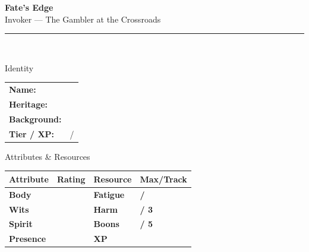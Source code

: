 \documentclass[10pt]{article}
\begin{document}
\begin{center}
    {\Huge\bfseries\sffamily\color{edgered} Fate's Edge}\\[0.2em]
    {\large\sffamily Invoker --- The Gambler at the Crossroads}\\[0.5em]
    \rule{0.5\textwidth}{0.5pt}\\[1em]
\end{center}

\begin{minipage}[t]{0.48\linewidth}
    \begin{charbox}{Identity}
        \begin{tabular}{p{2.5cm} p{5cm}}
            \textbf{Name:} & \underline{\hspace{4cm}} \\
            \textbf{Heritage:} & \underline{\hspace{4cm}} \\
            \textbf{Background:} & \underline{\hspace{4cm}} \\
            \textbf{Tier / XP:} & \underline{\hspace{2cm}} / \underline{\hspace{2cm}} \\
        \end{tabular}
    \end{charbox}
    
    \vspace{0.5em}
    
    \begin{charbox}{Attributes \& Resources}
        \begin{tabular}{>{\bfseries}p{2.5cm} >{\bfseries}p{1.5cm} >{\bfseries}p{2.5cm} >{\bfseries}p{1.5cm}}
            \toprule
            \textbf{Attribute} & \textbf{Rating} & \textbf{Resource} & \textbf{Max/Track} \\
            \midrule
            Body & \underline{\hspace{1.5cm}} & Fatigue & \underline{\hspace{1.5cm}} / \underline{\hspace{1.5cm}} \\
            Wits & \underline{\hspace{1.5cm}} & Harm & \underline{\hspace{1.5cm}} / 3 \\
            Spirit & \underline{\hspace{1.5cm}} & Boons & \underline{\hspace{1.5cm}} / 5 \\
            Presence & \underline{\hspace{1.5cm}} & XP & \underline{\hspace{1.5cm}} \\
            \bottomrule
        \end{tabular}
    \end{charbox}
    

\end{minipage}
\end{document}
